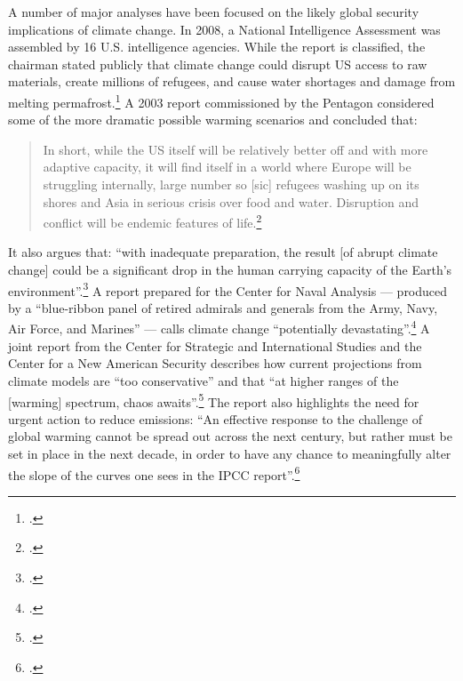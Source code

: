 A number of major analyses have been focused on the likely global security implications of climate change.
In 2008, a National Intelligence Assessment was assembled by 16 U.S. intelligence agencies.
While the report is classified, the chairman stated publicly that climate change could disrupt US access to raw materials, create millions of refugees, and cause water shortages and damage from melting permafrost.\footcite[][]{Craven}
A 2003 report commissioned by the Pentagon considered some of the more dramatic possible warming scenarios and concluded that:
\begin{quote}
In short, while the US itself will be relatively better off and with more adaptive capacity, it will find itself in a world where Europe will be struggling internally, large number so [sic] refugees washing up on its shores and Asia in serious crisis over food and water. Disruption and conflict will be endemic features of life.\footcite[][p. 22]{AbruptCCScenario}
\end{quote}
It also argues that: ``with inadequate preparation, the result [of abrupt climate change] could be a significant drop in the human carrying capacity of the Earth’s environment''.\footcite[][p. 1]{AbruptCCScenario}
A report prepared for the Center for Naval Analysis --- produced by a ``blue-ribbon panel of retired admirals and generals from the Army, Navy, Air Force, and Marines'' --- calls climate change ``potentially devastating''.\footcite[][p. 3]{NationalSecurityCC}
A joint report from the Center for Strategic and International Studies and the Center for a New American Security describes how current projections from climate models are ``too conservative'' and that ``at higher ranges of the [warming] spectrum, chaos awaits''.\footcite[][p. 78]{AgeOfConsequences}
The report also highlights the need for urgent action to reduce emissions: ``An effective response to the challenge of global warming cannot be spread out across the next century, but rather must be set in place in the next decade, in order to have any chance to meaningfully alter the slope of the curves one sees in the IPCC report''.\footcite[][p. 78]{AgeOfConsequences}



